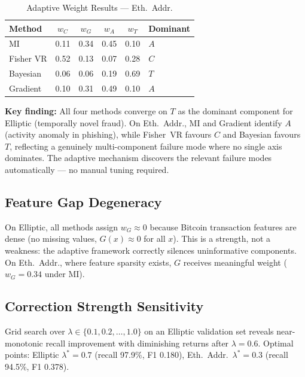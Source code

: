 \documentclass[journal]{IEEEtran}
\begin{document}
\begin{table}[!t]
\centering
\caption{Adaptive Weight Results --- Eth.\ Addr.}
\label{tab:weights_eth_addr}
\begin{tabular}{@{}lccccl@{}}
\toprule
\textbf{Method} & $w_C$ & $w_G$ & $w_A$ & $w_T$ & \textbf{Dominant} \\
\midrule
MI        & 0.11 & 0.34 & 0.45 & 0.10 & $A$ \\
Fisher VR & 0.52 & 0.13 & 0.07 & 0.28 & $C$ \\
Bayesian  & 0.06 & 0.06 & 0.19 & 0.69 & $T$ \\
Gradient  & 0.10 & 0.31 & 0.49 & 0.10 & $A$ \\
\bottomrule
\end{tabular}
\end{table}

\textbf{Key finding:} All four methods converge on $T$ as the dominant component for Elliptic (temporally novel fraud). On Eth.\ Addr., MI and Gradient identify $A$ (activity anomaly in phishing), while Fisher~VR favours $C$ and Bayesian favours $T$, reflecting a genuinely multi-component failure mode where no single axis dominates. The adaptive mechanism discovers the relevant failure modes automatically --- no manual tuning required.

\subsection{Feature Gap Degeneracy}
\label{ssec:feature_gap}

On Elliptic, all methods assign $w_G \approx 0$ because Bitcoin transaction features are dense (no missing values, $G(x) \approx 0$ for all $x$). This is a strength, not a weakness: the adaptive framework correctly silences uninformative components. On Eth.\ Addr., where feature sparsity exists, $G$ receives meaningful weight ($w_G = 0.34$ under MI).

\subsection{Correction Strength Sensitivity}
\label{ssec:sensitivity}

Grid search over $\lambda \in \{0.1, 0.2, \ldots, 1.0\}$ on an Elliptic validation set reveals near-monotonic recall improvement with diminishing returns after $\lambda = 0.6$. Optimal points: Elliptic $\lambda^* = 0.7$ (recall 97.9\%, F1 0.180), Eth.\ Addr.\ $\lambda^* = 0.3$ (recall 94.5\%, F1 0.378).
\end{document}
